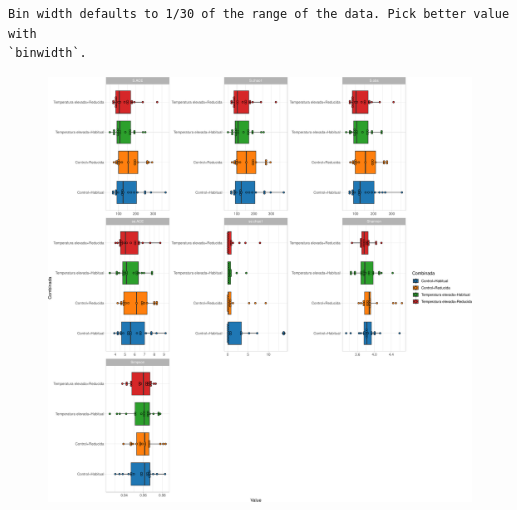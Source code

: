 \documentclass[
  letterpaper,
  DIV=11,
  numbers=noendperiod]{scrartcl}
\begin{document}
\begin{verbatim}
Bin width defaults to 1/30 of the range of the data. Pick better value with
`binwidth`.
\end{verbatim}

\begin{figure}[H]

{\centering \includegraphics{InformeNeiker_files/figure-pdf/unnamed-chunk-7-3.pdf}

}

\end{figure}
\end{document}
